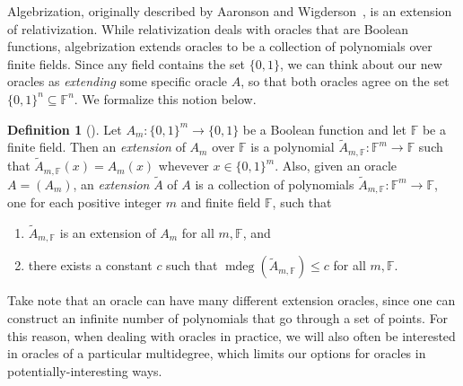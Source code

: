 \documentclass[english,12pt]{reedthesis}
\theoremstyle{plain}
\theoremstyle{definition}
\newtheorem{defn}[defn]{Definition}
\theoremstyle{remark}
\DeclareMathOperator{\mdeg}{mdeg}
\begin{document}
Algebrization, originally described by Aaronson and Wigderson~\cite{AW09}, is an
extension of relativization. While relativization deals with oracles that are
Boolean functions, algebrization extends oracles to be a collection of
polynomials over finite fields. Since any field contains the set $\{0, 1\}$, we
can think about our new oracles as \emph{extending} some specific oracle $A$, so
that both oracles agree on the set $\{0, 1\}^{n} \subseteq \mathbb{F}^{n}$. We formalize
this notion below.

\begin{defn}[{\cite[Def.\ 2.2]{AW09}}]\label{def:ext-oracle}
  Let $A_{m}\colon \{0, 1\}^{m} \rightarrow \{0, 1\}$ be a Boolean function and let
  $\mathbb{F}$ be a finite field. Then an \emph{extension} of $A_{m}$ over
  $\mathbb{F}$ is a polynomial
  $\tilde{A}_{m,\mathbb{F}}\colon \mathbb{F}^{m} \rightarrow \mathbb{F}$ such that
  $\tilde{A}_{m,\mathbb{F}}(x) = A_{m}(x)$ whevever $x \in \{0, 1\}^{m}$. Also,
  given an oracle $A = (A_{m})$, an \emph{extension} $\tilde{A}$ of $A$ is a
  collection of polynomials
  $\tilde{A}_{m,\mathbb{F}}\colon \mathbb{F}^{m} \rightarrow \mathbb{F}$, one for each
  positive integer $m$ and finite field $\mathbb{F}$, such that
  \begin{enumerate}
    \item $\tilde{A}_{m,\mathbb{F}}$ is an extension of $A_{m}$ for all
          $m,\mathbb{F}$, and
    \item there exists a constant $c$ such that
          $\mdeg(\tilde{A}_{m,\mathbb{F}}) \le c$ for all $m, \mathbb{F}$.
  \end{enumerate}
\end{defn}

Take note that an oracle can have many different extension oracles, since one
can construct an infinite number of polynomials that go through a set of points.
For this reason, when dealing with oracles in practice, we will also often be
interested in oracles of a particular multidegree, which limits our options for
oracles in potentially-interesting ways.
\end{document}
